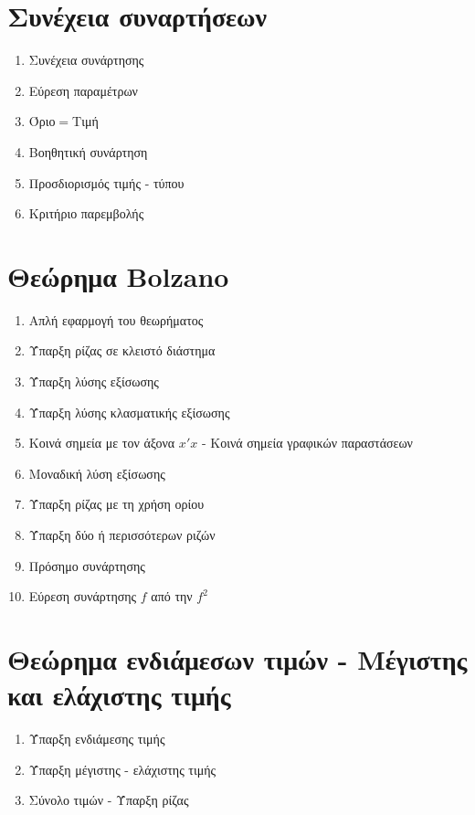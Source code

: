 \documentclass[twoside,nofonts,math,spyros,ektypwsh]{frontisthrio}
\begin{document}
\section{Συνέχεια συναρτήσεων}
\begin{multicols}{2}
\begin{enumerate}
\item Συνέχεια συνάρτησης
\item Εύρεση παραμέτρων
\item Όριο$ = $Τιμή
\item Βοηθητική συνάρτηση
\item Προσδιορισμός τιμής - τύπου
\item Κριτήριο παρεμβολής
\end{enumerate}
\end{multicols}
\section{Θεώρημα Bolzano}
\begin{multicols}{2}
\begin{enumerate}
\item Απλή εφαρμογή του θεωρήματος
\item Ύπαρξη ρίζας σε κλειστό διάστημα
\item Ύπαρξη λύσης εξίσωσης
\item Ύπαρξη λύσης κλασματικής εξίσωσης
\item Κοινά σημεία με τον άξονα $ x'x $ - Κοινά σημεία γραφικών παραστάσεων
\item Μοναδική λύση εξίσωσης
\item Ύπαρξη ρίζας με τη χρήση ορίου
\item Ύπαρξη δύο ή περισσότερων ριζών
\item Πρόσημο συνάρτησης
\item Εύρεση συνάρτησης $ f $ από την $ f^2 $
\end{enumerate}
\end{multicols}
\section{Θεώρημα ενδιάμεσων τιμών - Μέγιστης και ελάχιστης τιμής}
\begin{multicols}{2}
\begin{enumerate}
\item Ύπαρξη ενδιάμεσης τιμής
\item Ύπαρξη μέγιστης - ελάχιστης τιμής
\item Σύνολο τιμών - Ύπαρξη ρίζας
\end{enumerate}
\end{multicols}
\end{document}

